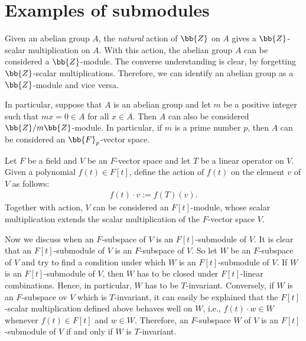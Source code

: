 \section{Examples of submodules}

\begin{exmp}
    Given an abelian group $A$, the \textit{natural} action of $\bb{Z}$ on $A$ gives a $\bb{Z}$-scalar multiplication on $A$.
    With this action, the abelian group $A$ can be considered a $\bb{Z}$-module.
    The converse understanding is clear, by forgetting $\bb{Z}$-scalar multiplications.
    Therefore, we can identify an abelian group as a $\bb{Z}$-module and vice versa.

    In particular, suppose that $A$ is an abelian group and let $m$ be a positive integer such that $mx=0\in A$ for all $x\in A$.
    Then $A$ can also be considered $\bb{Z}/m\bb{Z}$-module.
    In particular, if $m$ is a prime number $p$, then $A$ can be considered an $\bb{F}_p$-vector space.
\end{exmp}

\begin{exmp}
    Let $F$ be a field and $V$ be an $F$-vector space and let $T$ be a linear operator on $V$.
    Given a polynomial $f(t)\in F[t]$, define the action of $f(t)$ on the element $v$ of $V$ as follows:
    \begin{align*}
        f(t)\cdot v:=f(T)(v).
    \end{align*}
    Together with action, $V$ can be considered an $F[t]$-module, whose scalar multiplication extends the scalar multiplication of the $F$-vector space $V$.

    Now we discuss when an $F$-subspace of $V$ is an $F[t]$-submodule of $V$.
    It is clear that an $F[t]$-submodule of $V$ is an $F$-subspace of $V$.
    So let $W$ be an $F$-subspace of $V$ and try to find a condition under which $W$ is an $F[t]$-submodule of $V$.
    If $W$ is an $F[t]$-submodule of $V$, then $W$ has to be closed under $F[t]$-linear combinations.
    Hence, in particular, $W$ has to be $T$-invariant.
    Conversely, if $W$ is an $F$-subspace ov $V$ which is $T$-invariant, it can easily be explained that the $F[t]$-scalar multiplication defined above behaves well on $W$, i.e., $f(t)\cdot w\in W$ whenever $f(t)\in F[t]$ and $w\in W$.
    Therefore, an $F$-subspace $W$ of $V$ is an $F[t]$-submodule of $V$ if and only if $W$ is $T$-invariant.
\end{exmp}

